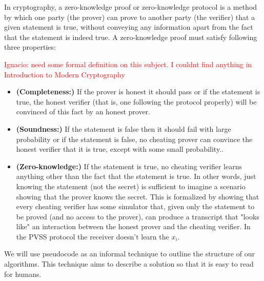  In cryptography, a zero-knowledge proof or zero-knowledge protocol is a method by which one party (the prover) can prove to another party (the verifier) that a given statement is true, without conveying any information apart from the fact that the statement is indeed true. A zero-knowledge proof must satisfy following three properties:
\begin{defi}
\textcolor{red}{Ignacio: need some formal definition on this subject. I couldnt find anything in Introduction to Modern Cryptography }
\end{defi}
\begin{itemize}
\item  \textnormal{\textbf{(Completeness:)}} If the prover is honest it should pass or if the statement is true, the honest verifier (that is, one following the protocol properly) will be convinced of this fact by an honest prover.
\item    \textnormal{\textbf{(Soundness:)}} If the statement is false then it should fail with large probability or if the statement is false, no cheating prover can convince the honest verifier that it is true, except with some small probability..
\item   \textnormal{\textbf{(Zero-knowledge:)}} If the statement is true, no cheating verifier learns anything other than the fact that the statement is true. In other words, just knowing the statement (not the secret) is sufficient to imagine a scenario showing that the prover knows the secret. This is formalized by showing that every cheating verifier has some simulator that, given only the statement to be proved (and no access to the prover), can produce a transcript that "looks like" an interaction between the honest prover and the cheating verifier. In the PVSS protocol the receiver doesn't learn the \begin{math}x_i \end{math}.
\end{itemize}



 We will use pseudocode as an informal technique to outline the structure of our algorithms. This technique aims to describe a solution so that it is easy to read for humans.\\



